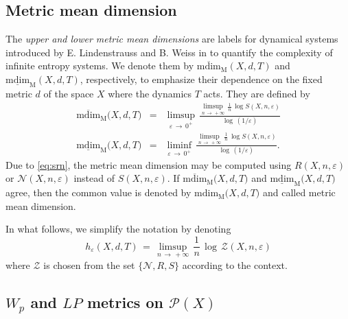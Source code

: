 \documentclass[11pt,a4paper,reqno]{amsart}
\theoremstyle{plain}
\theoremstyle{definition}
\newcommand{\vep}{\varepsilon}
\begin{document}
\subsection{Metric mean dimension}\label{sse:mdim}

The \emph{upper and lower metric mean dimensions} are labels for dynamical systems introduced by E. Lindenstrauss and B. Weiss in \cite{LW2000} to quantify the complexity of infinite entropy systems. We denote them by $\mathrm{\overline{mdim}_M}(X,d,T)$ and $\mathrm{\underline{mdim}_M}(X,d,T)$, respectively, to emphasize their dependence on the fixed metric $d$ of the space $X$ where the dynamics $T$ acts. They are defined by
\begin{eqnarray*}
\mathrm{\mathrm{\overline{mdim}_M}}\big(X,d,T\big) &=& \limsup_{\vep \, \to \, 0^+}\,\frac{\limsup_{n\, \to \, +\infty}\, \frac{1}{n}\,\log S(X,n,\vep)}{\log\,(1/\varepsilon)}\\
\mathrm{\underline{mdim}_M}\big(X,d,T\big) &=& \liminf_{\vep \, \to \, 0^+}\,\frac{\limsup_{n\, \to \, +\infty}\,\frac{1}{n}\,\log S(X,n,\vep)}{\log\,(1/\varepsilon)}.
\end{eqnarray*}
Due to \eqref{eq:srn}, the metric mean dimension may be computed using $R(X,n,\vep)$ or $\mathcal{N}(X,n,\vep)$ instead of $S(X,n,\vep)$. 
If  $\mathrm{\mathrm{\overline{mdim}_M}}\big(X,d,T\big)$ and $\mathrm{\mathrm{\underline{mdim}_M}}\big(X,d,T\big)$ agree, then the common value is denoted by $\mathrm{\mathrm{mdim}_M}\big(X,d,T\big)$ and called metric mean dimension.

\smallskip

In what follows, we simplify the notation by denoting
\begin{equation}\label{eq:he}
h_\vep(X,d,T) \, = \, \limsup_{n\, \to \, +\infty}\, \frac{1}{n}\,\log\, \mathcal{Z}(X,n,\vep)
\end{equation}
where $\mathcal{Z}$ is chosen from the set $\{\mathcal{N}, R, S\}$ according to the context.


\subsection{$W_p$ and $LP$ metrics on $\mathcal{P}(X)$}\label{sse:LP}
\end{document}
